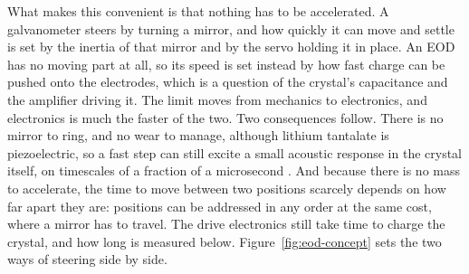 \documentclass{article}
\begin{document}
What makes this convenient is that nothing has to be accelerated. A galvanometer steers by
turning a mirror, and how quickly it can move and settle is set by the inertia of that mirror and
by the servo holding it in place. An EOD has no moving part at all, so its
speed is set instead by how fast charge can be pushed onto the electrodes, which is a question of
the crystal's capacitance and the amplifier driving it. The limit moves from mechanics to
electronics, and electronics is much the faster of the two. Two consequences follow. There is no
mirror to ring, and no wear to manage, although lithium tantalate is piezoelectric, so a fast step
can still excite a small acoustic response in the crystal itself, on timescales of a fraction of a
microsecond \cite{cassonElectroopticCoefficientsLithium2004}. And because there is no
mass to accelerate, the time to move between two positions scarcely depends on how far apart they
are: positions can be addressed in any order at the same cost, where a mirror has to travel. The
drive electronics still take time to charge the crystal, and how long is measured below.
Figure~\ref{fig:eod-concept} sets the two ways of steering side by side.
\end{document}
